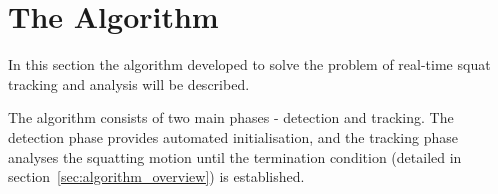 \section{The Algorithm}

In this section the algorithm developed to solve the problem of real-time squat tracking and analysis will be described. 

The algorithm consists of two main phases - detection and tracking. The detection phase provides automated initialisation, and the tracking phase analyses the squatting motion until the termination condition (detailed in section~\ref{sec:algorithm_overview}) is established.



